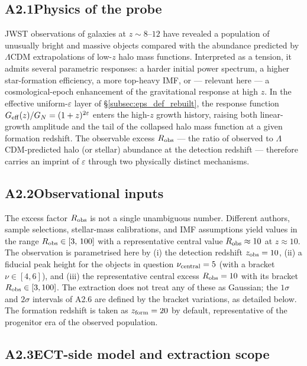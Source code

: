 \subsection*{A2.1\quad Physics of the probe}

JWST observations of galaxies at $z \sim 8\text{--}12$ have
revealed a population of unusually bright and massive objects
compared with the abundance predicted by $\Lambda$CDM
extrapolations of low-$z$ halo mass functions. Interpreted as a
tension, it admits several parametric responses: a harder initial
power spectrum, a higher star-formation efficiency, a more
top-heavy IMF, or --- relevant here --- a cosmological-epoch
enhancement of the gravitational response at high $z$. In the
effective uniform-$\varepsilon$ layer of
\S\ref{subsec:eps_def_rebuilt}, the response function
$G_{\rm eff}(z)/G_N = (1+z)^{2\varepsilon}$ enters the high-$z$
growth history, raising both linear-growth amplitude and the tail
of the collapsed halo mass function at a given formation redshift.
The observable excess $R_{\rm obs}$ --- the ratio of observed to
$\Lambda$CDM-predicted halo (or stellar) abundance at the
detection redshift --- therefore carries an imprint of $\varepsilon$
through two physically distinct mechanisms.


\subsection*{A2.2\quad Observational inputs}

The excess factor $R_{\rm obs}$ is not a single unambiguous number.
Different authors, sample selections, stellar-mass calibrations,
and IMF assumptions yield values in the range
$R_{\rm obs} \in [3,\,100]$ with a representative central value
$R_{\rm obs} \approx 10$ at $z \approx 10$. The observation is
parametrised here by (i) the detection redshift $z_{\rm obs} = 10$,
(ii) a fiducial peak height for the objects in question
$\nu_{\rm central} = 5$ (with a bracket $\nu \in [4, 6]$), and (iii)
the representative central excess $R_{\rm obs} = 10$ with its
bracket $R_{\rm obs} \in [3, 100]$. The extraction does not treat
any of these as Gaussian; the $1\sigma$ and $2\sigma$ intervals of
A2.6 are defined by the bracket variations, as detailed below. The
formation redshift is taken as $z_{\rm form} = 20$ by default,
representative of the progenitor era of the observed population.

\subsection*{A2.3\quad ECT-side model and extraction scope}

